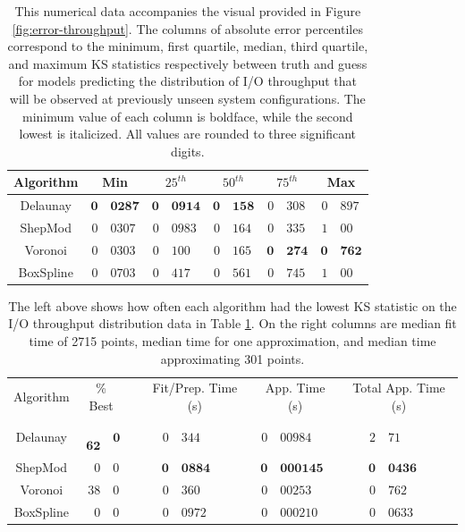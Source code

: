 \documentclass[smallextended,final]{svjour3}  %
\begin{document}
\begin{appendix}
\begin{table}
  \centering
  \begin{tabular}{c|r@{.}l|r@{.}l|r@{.}l|r@{.}l|r@{.}l}
    \hline
    Algorithm & \multicolumn{2}{c|}{Min} & \multicolumn{2}{c|}{$25^{th}$} & \multicolumn{2}{c|}{$50^{th}$} & \multicolumn{2}{c|}{$75^{th}$} & \multicolumn{2}{c}{Max}\\
    \hline
    Delaunay & $\mathbf{0}$&$\mathbf{0287}$ & $\mathbf{0}$&$\mathbf{0914}$ & $\mathbf{0}$&$\mathbf{158}$ & $\mathit{0}$&$\mathit{308}$ & $\mathit{0}$&$\mathit{897}$\\
    ShepMod & $0$&$0307$ & $\mathit{0}$&$\mathit{0983}$ & $\mathit{0}$&$\mathit{164}$ & $0$&$335$ & $1$&$00$\\
    Voronoi & $\mathit{0}$&$\mathit{0303}$ & $0$&$100$ & $0$&$165$ & $\mathbf{0}$&$\mathbf{274}$ & $\mathbf{0}$&$\mathbf{762}$\\
    BoxSpline & $0$&$0703$ & $0$&$417$ & $0$&$561$ & $0$&$745$ & $1$&$00$\\
    \hline
  \end{tabular}
  \caption{This numerical data accompanies the visual provided in
    Figure \ref{fig:error-throughput}. The columns of absolute error
    percentiles correspond to the minimum, first quartile, median,
    third quartile, and maximum KS statistics respectively between
    truth and guess for models predicting the distribution of I/O
    throughput that will be observed at previously unseen system
    configurations. The minimum value of each column is boldface,
    while the second lowest is italicized. All values are rounded to
    three significant digits.}
  \label{table:error-throughput}
\end{table}

\begin{table}
  \centering
  \begin{tabular}{|c|r@{.}l| c |r@{.}l|r@{.}l|r@{.}l|}
    \cline{1-3}\cline{5-10}
    Algorithm & \multicolumn{2}{c|}{\% Best} &  & \multicolumn{2}{c|}{Fit/Prep. Time (s)} & \multicolumn{2}{c|}{App. Time (s)} & \multicolumn{2}{c|}{Total App. Time (s)}\\
    \cline{1-3}\cline{5-10}
    Delaunay & \,\,$\mathbf{62}$&$\mathbf{0}$ &  & \quad\quad\quad$0$&$344$ & \quad$0$&$00984$ & \quad\quad\,\,$2$&$71$\\
    ShepMod & $0$&$0$ &  & $\mathbf{0}$&$\mathbf{0884}$ & $\mathbf{0}$&$\mathbf{000145}$ & $\mathbf{0}$&$\mathbf{0436}$\\
    Voronoi & $\mathit{38}$&$\mathit{0}$ &  & $0$&$360$ & $0$&$00253$ & $0$&$762$\\
    BoxSpline & $0$&$0$ &  & $\mathit{0}$&$\mathit{0972}$ & $\mathit{0}$&$\mathit{000210}$ & $\mathit{0}$&$\mathit{0633}$\\
    \cline{1-3}\cline{5-10}
  \end{tabular}
  \caption{The left above shows how often each algorithm had the
    lowest KS statistic on the I/O throughput distribution data in
    Table \ref{table:error-throughput}. On the right columns are
    median fit time of 2715 points, median time for one approximation,
    and median time approximating 301 points.}
  \label{table:best-throughput}
\end{table}


\end{appendix}
\end{document}
